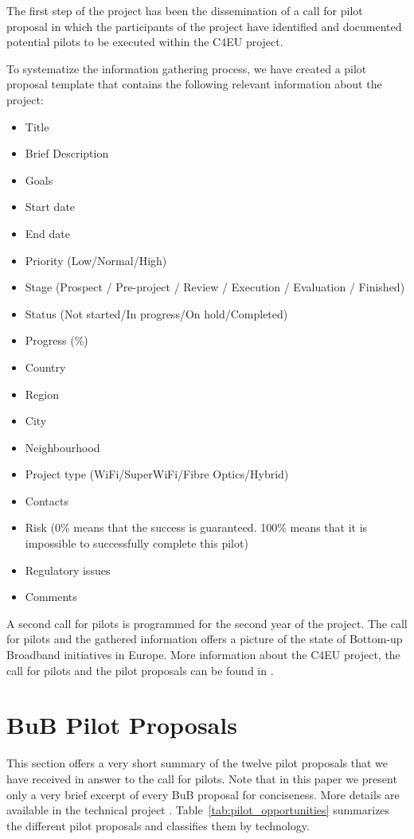 \documentclass[conference]{IEEEtran}
\begin{document}
The first step of the project has been the dissemination of a call for pilot proposal in which the participants of the project have identified and documented potential pilots to be executed within the C4EU project.

To systematize the information gathering process, we have created a pilot proposal template that contains the following relevant information about the project:

\begin{itemize}
  \item Title
  \item Brief Description
  \item Goals
  \item Start date
  \item End date
  \item Priority (Low/Normal/High)
  \item Stage 
  (Prospect / Pre-project / Review / Execution / Evaluation / Finished)
  \item Status (Not started/In progress/On hold/Completed)
  \item Progress (\%)
  \item Country
  \item Region
  \item City
  \item Neighbourhood
  \item Project type (WiFi/SuperWiFi/Fibre Optics/Hybrid)
  \item Contacts
  \item Risk (0\% means that the success is guaranteed. 100\% means that it is impossible to successfully complete this pilot)
  \item Regulatory issues
  \item Comments
\end{itemize}

A second call for pilots is programmed for the second year of the project. 
The call for pilots and the gathered information offers a picture of the state of Bottom-up Broadband initiatives in Europe.
More information about the C4EU project, the call for pilots and the pilot proposals can be found in \cite{barcelo2012bpp}.

\section{BuB Pilot Proposals}
\label{sec:proposals}

This section offers a very short summary of the twelve pilot proposals that we have received in answer to the call for pilots.
Note that in this paper we present only a very brief excerpt of every BuB proposal for conciseness. 
More details are available in the technical project \cite{barcelo2012bpp}.
Table~\ref{tab:pilot_opportunities} summarizes the different pilot proposals and classifies them by technology.
\end{document}
